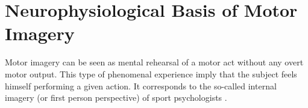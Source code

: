 \documentclass[journal,twocolumn]{IEEEtran}
\begin{document}




\section{Neurophysiological Basis of Motor Imagery} \label{sect:PL} \cite{pfurtscheller2001motor, decety1996neurophysiological}

Motor imagery can be seen as mental rehearsal of a motor act without any overt motor output. This type of phenomenal experience imply that the subject feels himself performing a given action. It corresponds to the so-called internal imagery (or first person perspective) of sport psychologists \cite{landers1983effects}.
\end{document}
